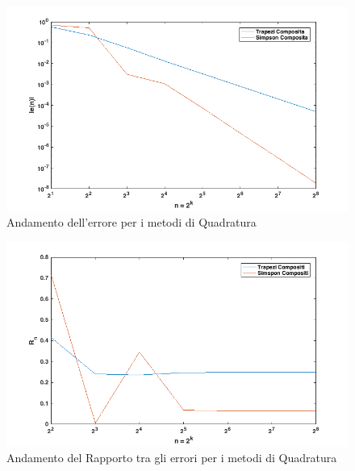 
\begin{figure}
\includegraphics[width=\textwidth]{cap_5_6/es2/error.png}
\caption{Andamento dell'errore per i metodi di Quadratura}
\label{QuadrErr}
\end{figure}
\begin{figure}
\includegraphics[width=\textwidth]{cap_5_6/es2/rapp_err.png}
\caption{Andamento del Rapporto tra gli errori per i metodi di Quadratura}
\label{QuadrRapp}
\end{figure}
